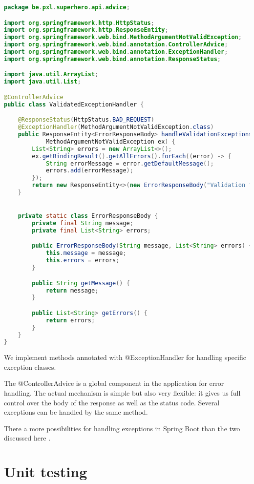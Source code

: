 \begin{lstlisting}[language=java, frame=single]
package be.pxl.superhero.api.advice;

import org.springframework.http.HttpStatus;
import org.springframework.http.ResponseEntity;
import org.springframework.web.bind.MethodArgumentNotValidException;
import org.springframework.web.bind.annotation.ControllerAdvice;
import org.springframework.web.bind.annotation.ExceptionHandler;
import org.springframework.web.bind.annotation.ResponseStatus;

import java.util.ArrayList;
import java.util.List;

@ControllerAdvice
public class ValidatedExceptionHandler {

	@ResponseStatus(HttpStatus.BAD_REQUEST)
	@ExceptionHandler(MethodArgumentNotValidException.class)
	public ResponseEntity<ErrorResponseBody> handleValidationExceptions(
			MethodArgumentNotValidException ex) {
		List<String> errors = new ArrayList<>();
		ex.getBindingResult().getAllErrors().forEach((error) -> {
			String errorMessage = error.getDefaultMessage();
			errors.add(errorMessage);
		});
		return new ResponseEntity<>(new ErrorResponseBody("Validation failed.", errors), HttpStatus.BAD_REQUEST);
	}


	private static class ErrorResponseBody {
		private final String message;
		private final List<String> errors;

		public ErrorResponseBody(String message, List<String> errors) {
			this.message = message;
			this.errors = errors;
		}

		public String getMessage() {
			return message;
		}

		public List<String> getErrors() {
			return errors;
		}
	}
}
\end{lstlisting}

We implement methods annotated with @ExceptionHandler for handling specific exception classes. 

The @ControllerAdvice is a global component in the application for error handling. The actual mechanism is simple but also very flexible: it gives us full control over the body of the response as well as the status code.  Several exceptions can be handled by the same method.

There a more possibilities for handling exceptions in Spring Boot  than the two discussed here \cite{exhand}.

\section{Unit testing}

